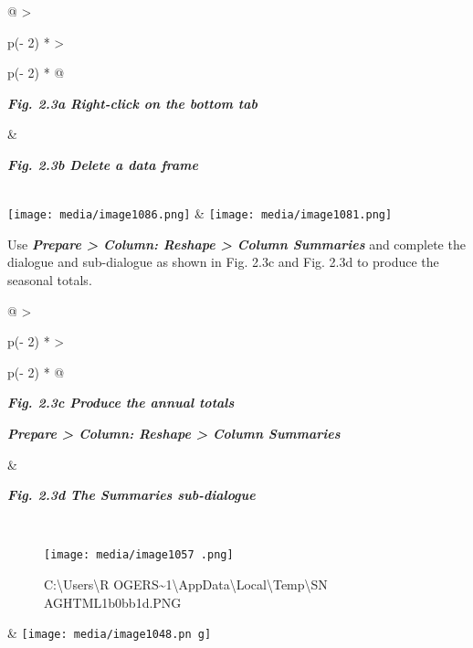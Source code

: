 \documentclass[
  letterpaper,
  DIV=11,
  numbers=noendperiod]{scrreprt}
\begin{document}
\begin{longtable}[]{@{}
  >{\raggedright\arraybackslash}p{(\columnwidth - 2\tabcolsep) * }
  >{\raggedright\arraybackslash}p{(\columnwidth - 2\tabcolsep) * }@{}}
\toprule\noalign{}
\begin{minipage}[b]{\linewidth}\raggedright
\textbf{\emph{Fig. 2.3a Right-click on the bottom tab}}
\end{minipage} & \begin{minipage}[b]{\linewidth}\raggedright
\textbf{\emph{Fig. 2.3b Delete a data frame}}
\end{minipage} \\
\midrule\noalign{}
\endhead
\bottomrule\noalign{}
\endlastfoot
\texttt{[image: media/image1086.png]}
&
\texttt{[image: media/image1081.png]} \\
\end{longtable}

Use \textbf{\emph{Prepare \textgreater{} Column: Reshape \textgreater{}
Column Summaries}} and complete the dialogue and sub-dialogue as shown
in Fig. 2.3c and Fig. 2.3d to produce the seasonal totals.

\begin{longtable}[]{@{}
  >{\raggedright\arraybackslash}p{(\columnwidth - 2\tabcolsep) * }
  >{\raggedright\arraybackslash}p{(\columnwidth - 2\tabcolsep) * }@{}}
\toprule\noalign{}
\begin{minipage}[b]{\linewidth}\raggedright
\textbf{\emph{Fig. 2.3c Produce the annual totals}}

\textbf{\emph{Prepare \textgreater{} Column: Reshape \textgreater{}
Column Summaries}}
\end{minipage} & \begin{minipage}[b]{\linewidth}\raggedright
\textbf{\emph{Fig. 2.3d The Summaries sub-dialogue}}
\end{minipage} \\
\midrule\noalign{}
\endhead
\bottomrule\noalign{}
\endlastfoot
\begin{minipage}[t]{\linewidth}\raggedright
\begin{figure}[H]

{\centering \texttt{[image: media/image1057 .png]}

}

\caption{C:\textbackslash Users\textbackslash R
OGERS\textasciitilde1\textbackslash AppData\textbackslash Local\textbackslash Temp\textbackslash SN
AGHTML1b0bb1d.PNG}

\end{figure}%
\end{minipage} &
\texttt{[image: media/image1048.pn g]} \\
\end{longtable}
\end{document}
